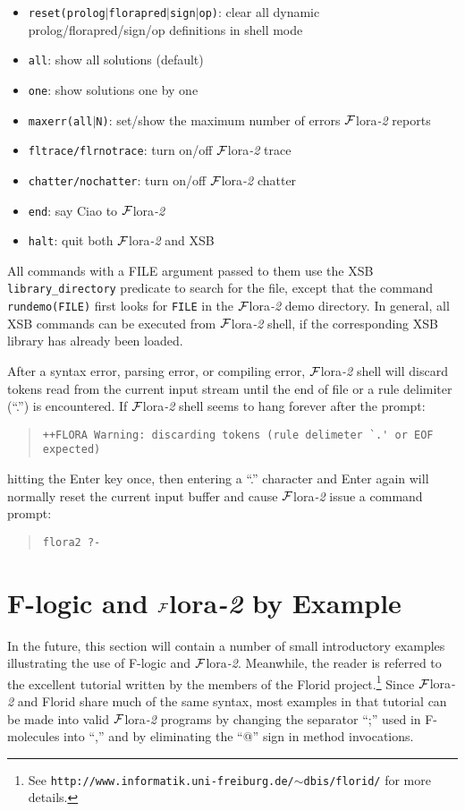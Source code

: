 \documentclass[11pt]{article}
\newcommand{\FLORA}{{\mbox{${\cal F}${\sc lora}\rm\emph{-2}}}\xspace}
\newcommand{\FLORID}{{\mbox{\sc Florid}}\xspace}
\newcommand{\fl}{\mbox{F-logic}\xspace}
\begin{document}
\begin{itemize}
\item {\tt reset(prolog$|$florapred$|$sign$|$op)}:
    clear all dynamic prolog/florapred/sign/op definitions in shell mode
\item {\tt all}:
    show all solutions (default)
\item {\tt one}:
    show solutions one by one
\item {\tt maxerr(all$|$N)}:
    set/show the maximum number of errors \FLORA reports
\item {\tt fltrace/flrnotrace}:
    turn on/off \FLORA trace
\item {\tt chatter/nochatter}:
    turn on/off \FLORA chatter
\item {\tt end}:
    say Ciao to \FLORA
\item {\tt halt}:
    quit both \FLORA and XSB
\end{itemize}

All commands with a FILE argument passed to them use the XSB
{\tt library\_directory} predicate to search for the file, except that the
command {\tt rundemo(FILE)} first looks for {\tt FILE} in the \FLORA demo
directory. In general, all XSB commands can be executed from \FLORA shell,
if the corresponding XSB library has already been loaded.

After a syntax error, parsing error, or compiling error, \FLORA shell will
discard tokens read from the current input stream until the end of file or a
rule delimiter (``.'') is encountered. If \FLORA shell seems to hang forever
after the prompt:
\begin{quote}
\begin{verbatim}
++FLORA Warning: discarding tokens (rule delimeter `.' or EOF expected)
\end{verbatim}
\end{quote}
hitting the Enter key once, then entering a ``.'' character and Enter again
will normally reset the current input buffer and cause \FLORA issue a
command prompt:
\begin{quote}
\begin{verbatim}
flora2 ?-
\end{verbatim}
\end{quote}

 
\section{\fl and \FLORA by Example}


In the future, this section will contain a number of small
introductory examples illustrating the use of \fl and \FLORA. Meanwhile, the
reader is referred to the excellent tutorial written by the members of the
\FLORID project.\footnote{
  See {\tt http://www.informatik.uni-freiburg.de/$\sim$dbis/florid/} for more
  details.
  }
Since \FLORA and \FLORID share much of the same syntax, most examples in that
tutorial can be made into valid \FLORA programs by changing the separator
``;'' used in F-molecules into ``,'' and by eliminating the ``@''
sign in method invocations.
\end{document}
